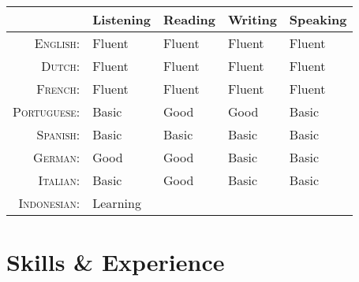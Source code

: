 \documentclass[a4paper,10pt]{article} %
\begin{document}
\begin{tabular}{rllll}
	& Listening & Reading & Writing & Speaking \\
	\hline
	
	\textsc{English:} & \footnotesize{Fluent} & \footnotesize{Fluent} & \footnotesize{Fluent} & \footnotesize{Fluent}\\
	
	\textsc{Dutch:} & \footnotesize{Fluent} & \footnotesize{Fluent} & \footnotesize{Fluent} & \footnotesize{Fluent}\\
	
	\textsc{French:} & \footnotesize{Fluent} & \footnotesize{Fluent} & \footnotesize{Fluent} & \footnotesize{Fluent}\\
	
	\textsc{Portuguese:} & \footnotesize{Basic} & \footnotesize{Good} & \footnotesize{Good} & \footnotesize{Basic}\\
	
	\textsc{Spanish:} & \footnotesize{Basic} & \footnotesize{Basic} & \footnotesize{Basic} & \footnotesize{Basic}\\
	
	\textsc{German:} & \footnotesize{Good} & \footnotesize{Good} & \footnotesize{Basic} & \footnotesize{Basic}\\
	
	\textsc{Italian:} & \footnotesize{Basic} & \footnotesize{Good} & \footnotesize{Basic} & \footnotesize{Basic}\\
	
	\textsc{Indonesian:} & \footnotesize{Learning} &  &  & \\
\end{tabular}






\section{Skills \& Experience}
\end{document}
